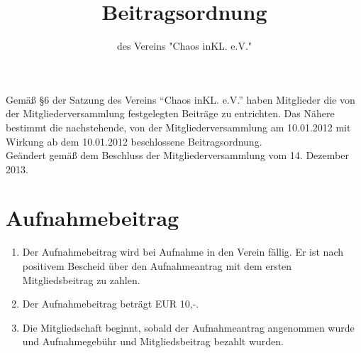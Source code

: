 \documentclass[a4paper, 12pt]{scrartcl}
\title{Beitragsordnung}
\subtitle{des Vereins "Chaos inKL. e.V."}
\author{}
\date{}
\begin{document}
\maketitle

\noindent Gemäß §6 der Satzung des Vereins "`Chaos inKL. e.V."'
haben Mitglieder die von der Mitgliederversammlung
festgelegten Beiträge zu entrichten. Das Nähere bestimmt die
nachstehende, von der Mitgliederversammlung am 10.01.2012 mit Wirkung ab
dem 10.01.2012 beschlossene Beitragsordnung. \\[0.5cm]
Geändert gemäß dem Beschluss der Mitgliederversammlung vom 14. Dezember 2013.

\section{Aufnahmebeitrag}
\begin{enumerate}
	\item Der Aufnahmebeitrag wird bei Aufnahme in den Verein fällig. Er ist nach positivem Bescheid über den Aufnahmeantrag mit dem ersten Mitgliedsbeitrag zu zahlen.
	\item Der Aufnahmebeitrag beträgt EUR 10,-.
	\item Die Mitgliedschaft beginnt, sobald der Aufnahmeantrag angenommen wurde und Aufnahmegebühr und Mitgliedsbeitrag bezahlt wurden.
\end{enumerate}
\end{document}
